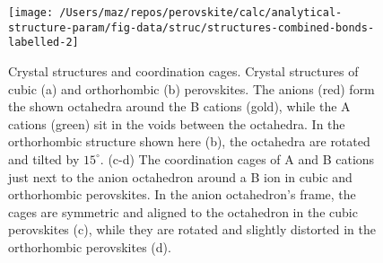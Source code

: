 \documentclass[a4paper,prb,twocolumn]{revtex4-1}  %
\begin{document}
\begin{figure}[htbp]
\begin{center}
\texttt{[image: /Users/maz/repos/perovskite/calc/analytical-structure-param/fig-data/struc/structures-combined-bonds-labelled-2]}
\caption{
Crystal structures and coordination cages.
Crystal structures of cubic (a) and orthorhombic (b) perovskites.
The anions (red) form the shown octahedra around 
the B cations (gold), while the A cations (green) sit in the voids between the octahedra.
In the orthorhombic structure shown here (b),
 the octahedra are rotated and tilted by $15^\circ$.
(c-d)
The coordination cages of A %
and B 
cations just next to the anion 
octahedron
around a B ion in cubic %
 and orthorhombic %
  perovskites.
In the anion octahedron's frame,
the cages are symmetric and aligned to the octahedron in the cubic perovskites (c),
while they are rotated and slightly distorted in the orthorhombic perovskites (d).
}
\label{fig:struc}
\end{center}
\end{figure}
\end{document}
